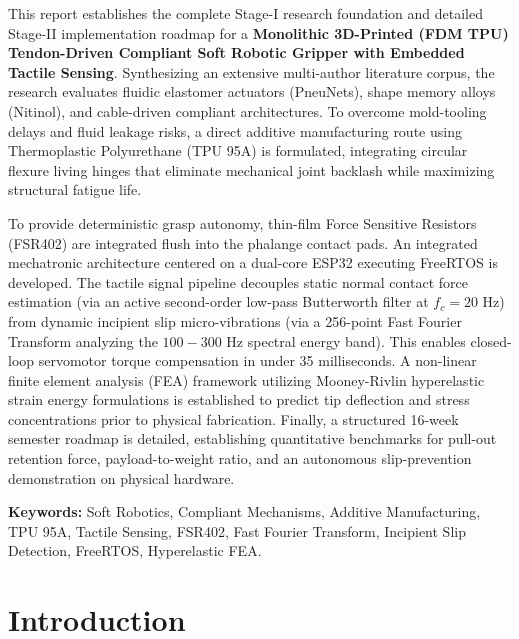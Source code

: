 \documentclass[12pt,a4paper]{report}
\begin{document}
This report establishes the complete Stage-I research foundation and detailed Stage-II implementation roadmap for a \textbf{Monolithic 3D-Printed (FDM TPU) Tendon-Driven Compliant Soft Robotic Gripper with Embedded Tactile Sensing}. Synthesizing an extensive multi-author literature corpus, the research evaluates fluidic elastomer actuators (PneuNets), shape memory alloys (Nitinol), and cable-driven compliant architectures. To overcome mold-tooling delays and fluid leakage risks, a direct additive manufacturing route using Thermoplastic Polyurethane (TPU 95A) is formulated, integrating circular flexure living hinges that eliminate mechanical joint backlash while maximizing structural fatigue life. 

To provide deterministic grasp autonomy, thin-film Force Sensitive Resistors (FSR402) are integrated flush into the phalange contact pads. An integrated mechatronic architecture centered on a dual-core ESP32 executing FreeRTOS is developed. The tactile signal pipeline decouples static normal contact force estimation (via an active second-order low-pass Butterworth filter at $f_c = 20\text{ Hz}$) from dynamic incipient slip micro-vibrations (via a 256-point Fast Fourier Transform analyzing the $100 - 300\text{ Hz}$ spectral energy band). This enables closed-loop servomotor torque compensation in under 35 milliseconds. A non-linear finite element analysis (FEA) framework utilizing Mooney-Rivlin hyperelastic strain energy formulations is established to predict tip deflection and stress concentrations prior to physical fabrication. Finally, a structured 16-week semester roadmap is detailed, establishing quantitative benchmarks for pull-out retention force, payload-to-weight ratio, and an autonomous slip-prevention demonstration on physical hardware.

\vspace{5mm}
\noindent\textbf{Keywords:} Soft Robotics, Compliant Mechanisms, Additive Manufacturing, TPU 95A, Tactile Sensing, FSR402, Fast Fourier Transform, Incipient Slip Detection, FreeRTOS, Hyperelastic FEA.

\newpage
\tableofcontents
\newpage
\listoffigures
\newpage
\listoftables

\newpage
{}
\setcounter{page}{1}

\chapter{Introduction}
\end{document}
